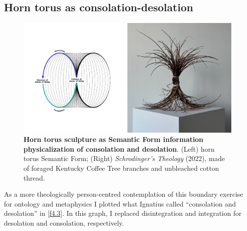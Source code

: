 \subsection{Horn torus as consolation-desolation}
\begin{figure}[h!]
    \centering
    \includegraphics[width=\linewidth]{figures/4.3.png}
    \caption[Horn torus sculpture as Semantic Form information physicalization]{\textbf{Horn torus sculpture as Semantic Form information physicalization of consolation and desolation}. (Left) horn torus Semantic Form; (Right) \textit{Schrodinger’s Theology} (2022), made of foraged Kentucky Coffee Tree branches and unbleached cotton thread.}
    \label{f4.3}
\end{figure}
As a more theologically person-centred contemplation of this boundary exercise for ontology and metaphysics I plotted what Ignatius called ``consolation and desolation” \citep{loyola_spiritual_1522,loyola_ejercicios_1548,loyola_spiritual_1914} in \autoref{f4.3}. In this graph, I replaced disintegration and integration for desolation and consolation, respectively.







